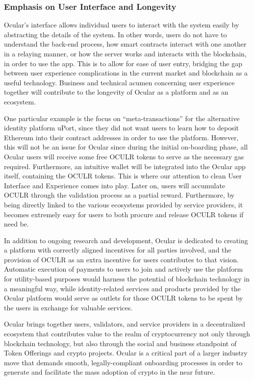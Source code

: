\documentclass[a4paper]{article}
\begin{document}
\subsubsection*{Emphasis on User Interface and Longevity}
Ocular's interface allows individual users to interact with the system easily by abstracting the details of the system. In other words, users do not have to understand the back-end process, how smart contracts interact with one another in a relaying manner, or how the server works and interacts with the blockchain, in order to use the app. This is to allow for ease of user entry, bridging the gap between user experience complications in the current market and blockchain as a useful technology. Business and technical acumen concerning user experience together will contribute to the longevity of Ocular as a platform and as an ecosystem.

One particular example is the focus on ``meta-transactions'' for the alternative identity platform uPort, since they did not want users to learn how to deposit Ethereum into their contract addresses in order to use the platform. However, this will not be an issue for Ocular since during the initial on-boarding phase, all Ocular users will receive some free OCULR tokens to serve as the necessary gas required. Furthermore, an intuitive wallet will be integrated into the Ocular app itself, containing the OCULR tokens. This is where our attention to clean User Interface and Experience comes into play. Later on, users will accumulate OCULR through the validation process as a partial reward. Furthermore, by being directly linked to the various ecosystems provided by service providers, it becomes extremely easy for users to both procure and release OCULR tokens if need be.  

In addition to ongoing research and development, Ocular is dedicated to creating a platform with correctly aligned incentives for all parties involved, and the provision of OCULR as an extra incentive for users contributes to that vision. Automatic execution of payments to users to join and actively use the platform for utility-based purposes would harness the potential of blockchain technology in a meaningful way, while identity-related services and products provided by the Ocular platform would serve as outlets for those OCULR tokens to be spent by the users in exchange for valuable services. 

Ocular brings together users, validators, and service providers in a decentralized ecosystem that contributes value to the realm of cryptocurrency not only through blockchain technology, but also through the social and business standpoint of Token Offerings and crypto projects. Ocular is a critical part of a larger industry move that demands smooth, legally-compliant onboarding processes in order to generate and facilitate the mass adoption of crypto in the near future.
\end{document}
